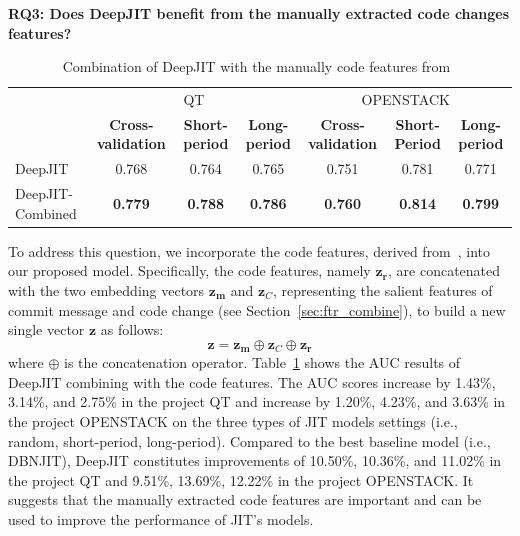 \noindent \textbf{RQ3: Does DeepJIT benefit from the manually extracted code changes features?}

\begin{table}[t!]
  \centering
  \caption{Combination of DeepJIT with the manually code features from~\cite{mcintosh2018fix}}
    \begin{tabular}{|l|c|c|c|c|c|c|}
    \hline
    \multirow{2}[4]{*}{} & \multicolumn{3}{c|}{QT} & \multicolumn{3}{c|}{OPENSTACK} \\
\cline{2-7}          & \textbf{Cross-validation} & \textbf{Short-period} & \textbf{Long-period} & \textbf{Cross-validation} & \textbf{Short-Period} & \textbf{Long-period} \\
    \hline
    \hline
    DeepJIT & 0.768 & 0.764 & 0.765 & 0.751 & 0.781 & 0.771  \\
    \hline
    DeepJIT-Combined & \textbf{0.779} & \textbf{0.788} & \textbf{0.786}  & \textbf{0.760} & \textbf{0.814} & \textbf{0.799} \\
    \hline
    \end{tabular}%
  \label{tab:combined}%
\end{table}%

To address this question, we incorporate the code features, derived from~\cite{mcintosh2018fix}, into our proposed model. Specifically, the code features, namely $\textbf{z}_\textbf{r}$, are concatenated with the two embedding vectors  $\textbf{z}_\textbf{m}$ and $\textbf{z}_C$, representing the salient features of commit message and code change (see Section~\ref{sec:ftr_combine}), to build a new single vector $\textbf{z}$ as follows:
\begin{equation}
\label{eq:combined_ftr}
\textbf{z} = \textbf{z}_\textbf{m} \oplus \textbf{z}_C \oplus \textbf{z}_\textbf{r}
\end{equation}
where $\oplus$ is the concatenation operator. Table~\ref{tab:combined} shows the AUC results of DeepJIT combining with the code features. The AUC scores increase by 1.43\%, 3.14\%, and 2.75\% in the project QT and increase by 1.20\%, 4.23\%, and 3.63\% in the project OPENSTACK on the three types of JIT models settings (i.e., random, short-period, long-period). Compared to the best baseline model (i.e., DBNJIT), DeepJIT constitutes improvements of 10.50\%, 10.36\%, and 11.02\% in the project QT and 9.51\%, 13.69\%, 12.22\% in the project OPENSTACK. It suggests that the manually extracted code features are important and can be used to improve the performance of JIT's models.

